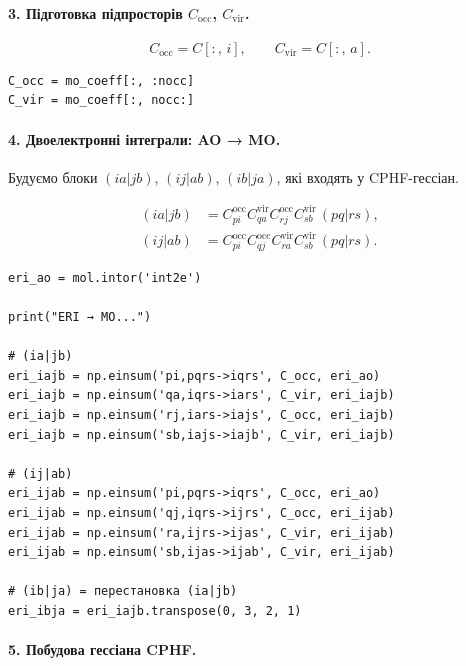 \documentclass{PySCFBook}
\begin{document}
\paragraph{3. Підготовка підпросторів $C_{\text{occ}}$, $C_{\text{vir}}$.}

\[
C_{\text{occ}} = C[:,\, i],\qquad
C_{\text{vir}} = C[:,\, a].
\]

\begin{verbatim}
C_occ = mo_coeff[:, :nocc]
C_vir = mo_coeff[:, nocc:]
\end{verbatim}

\paragraph{4. Двоелектронні інтеграли: AO → MO.}

Будуємо блоки
\((ia|jb)\), \((ij|ab)\), \((ib|ja)\),
які входять у CPHF-гессіан.

\begin{align*}
(ia|jb) &= C_{pi}^{\text{occ}} C_{qa}^{\text{vir}}
          C_{rj}^{\text{occ}} C_{sb}^{\text{vir}}\, (pq|rs),
\\
(ij|ab) &= C_{pi}^{\text{occ}} C_{qj}^{\text{occ}}
          C_{ra}^{\text{vir}} C_{sb}^{\text{vir}}\, (pq|rs).
\end{align*}

\begin{verbatim}
eri_ao = mol.intor('int2e')

print("ERI → MO...")

# (ia|jb)
eri_iajb = np.einsum('pi,pqrs->iqrs', C_occ, eri_ao)
eri_iajb = np.einsum('qa,iqrs->iars', C_vir, eri_iajb)
eri_iajb = np.einsum('rj,iars->iajs', C_occ, eri_iajb)
eri_iajb = np.einsum('sb,iajs->iajb', C_vir, eri_iajb)

# (ij|ab)
eri_ijab = np.einsum('pi,pqrs->iqrs', C_occ, eri_ao)
eri_ijab = np.einsum('qj,iqrs->ijrs', C_occ, eri_ijab)
eri_ijab = np.einsum('ra,ijrs->ijas', C_vir, eri_ijab)
eri_ijab = np.einsum('sb,ijas->ijab', C_vir, eri_ijab)

# (ib|ja) = перестановка (ia|jb)
eri_ibja = eri_iajb.transpose(0, 3, 2, 1)
\end{verbatim}

\paragraph{5. Побудова гессіана CPHF.}
\end{document}
